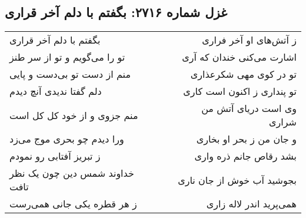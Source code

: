 \begin{center}
\section*{غزل شماره ۲۷۱۶: بگفتم با دلم آخر قراری}
\label{sec:2716}
\begin{longtable}{l p{0.5cm} r}
بگفتم با دلم آخر قراری
&&
ز آتش‌های او آخر فراری
\\
تو را می‌گویم و تو از سر طنز
&&
اشارت می‌کنی خندان که آری
\\
منم از دست تو بی‌دست و پایی
&&
تو در کوی مهی شکرعذاری
\\
دلم گفتا ندیدی آنچ دیدم
&&
تو پنداری ز اکنون است کاری
\\
منم جزوی و از خود کل کل است
&&
وی است دریای آتش من شراری
\\
ورا دیدم چو بحری موج می‌زد
&&
و جان من ز بحر او بخاری
\\
ز تبریز آفتابی رو نمودم
&&
بشد رقاص جانم ذره واری
\\
خداوند شمس دین چون یک نظر تافت
&&
بجوشید آب خوش از جان ناری
\\
ز هر قطره یکی جانی همی‌رست
&&
همی‌پرید اندر لاله زاری
\\
\end{longtable}
\end{center}
